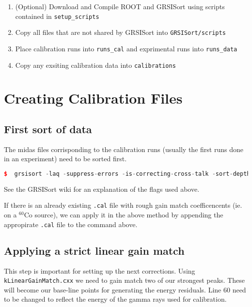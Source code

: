 \documentclass[10pt]{article} %
\begin{document}
\begin{enumerate}
\item
(Optional) Download and Compile ROOT and GRSISort using scripts contained in \texttt{setup\_scripts}

\item
Copy all files that are not shared by GRSISort into \texttt{GRSISort/scripts}

\item
Place calibration runs into \texttt{runs\_cal} and exprimental runs into \texttt{runs\_data}

\item
Copy any exsiting calibration data into \texttt{calibrations}

\end{enumerate}

\section{Creating Calibration Files}

\subsection{First sort of data}
The midas files corrisponding to the calibration runs (usually the first runs done in an experiment) need to be sorted first.

\begin{lstlisting}[language=c++]
$  grsisort -laq -suppress-errors -is-correcting-cross-talk -sort-depth=70000000 /dir/to/midas/file
\end{lstlisting}

See the GRSISort wiki for an explanation of the flags used above.

If there is an already existing \texttt{.cal} file with rough gain match coefficencents (ie. on a $^{60}$Co source), we can apply it in the above method by appending the appropirate \texttt{.cal} file to the command above.

\subsection{Applying a strict linear gain match}

This step is important for setting up the next corrections.
Using \texttt{kLinearGainMatch.cxx} we need to gain match two of our strongest peaks.
These will become our base-line points for generating the energy residuals.
Line 60 need to be changed to reflect the energy of the gamma rays used for calibration.
\end{document}
